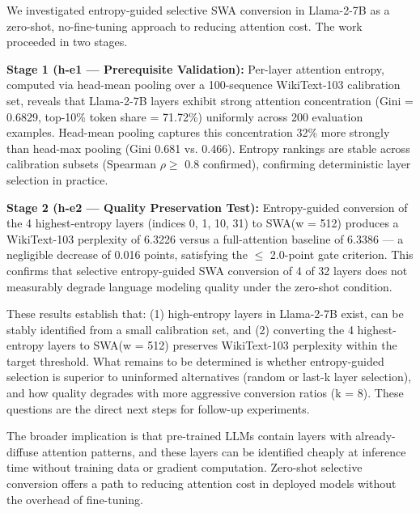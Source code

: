 
We investigated entropy-guided selective SWA conversion in Llama-2-7B as a zero-shot, no-fine-tuning approach to reducing attention cost. The work proceeded in two stages.

\textbf{Stage 1 (h-e1 --- Prerequisite Validation):} Per-layer attention entropy, computed via head-mean pooling over a 100-sequence WikiText-103 calibration set, reveals that Llama-2-7B layers exhibit strong attention concentration (Gini = 0.6829, top-10\% token share = 71.72\%) uniformly across 200 evaluation examples. Head-mean pooling captures this concentration 32\% more strongly than head-max pooling (Gini 0.681 vs. 0.466). Entropy rankings are stable across calibration subsets (Spearman $\rho \geq$ 0.8 confirmed), confirming deterministic layer selection in practice.

\textbf{Stage 2 (h-e2 --- Quality Preservation Test):} Entropy-guided conversion of the 4 highest-entropy layers (indices 0, 1, 10, 31) to SWA(w = 512) produces a WikiText-103 perplexity of 6.3226 versus a full-attention baseline of 6.3386 --- a negligible decrease of 0.016 points, satisfying the $\leq$ 2.0-point gate criterion. This confirms that selective entropy-guided SWA conversion of 4 of 32 layers does not measurably degrade language modeling quality under the zero-shot condition.

These results establish that: (1) high-entropy layers in Llama-2-7B exist, can be stably identified from a small calibration set, and (2) converting the 4 highest-entropy layers to SWA(w = 512) preserves WikiText-103 perplexity within the target threshold. What remains to be determined is whether entropy-guided selection is superior to uninformed alternatives (random or last-k layer selection), and how quality degrades with more aggressive conversion ratios (k = 8). These questions are the direct next steps for follow-up experiments.

The broader implication is that pre-trained LLMs contain layers with already-diffuse attention patterns, and these layers can be identified cheaply at inference time without training data or gradient computation. Zero-shot selective conversion offers a path to reducing attention cost in deployed models without the overhead of fine-tuning.

